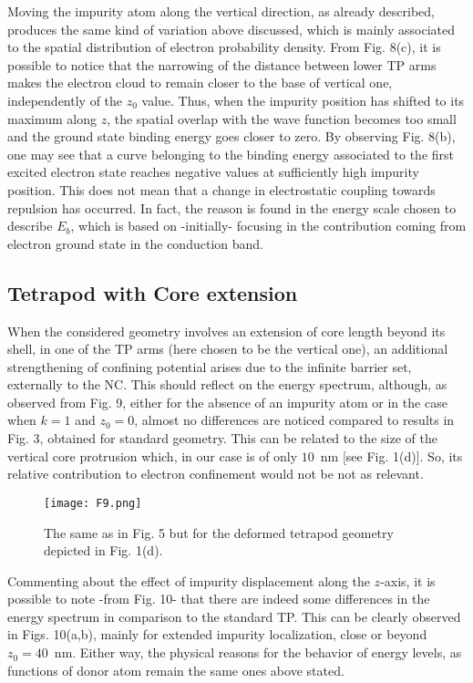 \documentclass[nanomaterials,article,submit,moreauthors,pdftex]{Definitions/mdpi}
\begin{document}
Moving the impurity atom along the vertical direction, as already described, produces the same kind of variation above discussed, which is mainly associated to the spatial distribution of electron probability density. From Fig. 8(c), it is possible to notice that the narrowing of the distance between lower TP arms makes the electron cloud to remain closer to the base of vertical one, independently of the $z_0$ value. Thus, when the impurity position has shifted to its maximum along $z$, the spatial overlap with the wave function becomes too small and the ground state binding energy goes closer to zero. By observing Fig. 8(b), one may see that a curve belonging to the binding energy associated to the first excited electron state reaches negative values at sufficiently high impurity position. This does not mean that a change in electrostatic coupling towards repulsion has occurred. In fact, the reason is found in the energy scale chosen to describe $E_b$, which is based on -initially- focusing in the contribution coming from electron ground state in the conduction band.

\subsection{Tetrapod with Core extension}

When the considered geometry involves an extension of core length beyond its shell, in one of the TP arms (here chosen to be the vertical one), an additional strengthening of confining potential arises due to the infinite barrier set, externally to the NC. This should reflect on the energy spectrum, although, as observed from Fig. 9, either for the absence of an impurity atom or in the case when $k=1$ and $z_0=0$, almost no differences are noticed compared to results in Fig. 3, obtained for standard geometry. This can be related to the size of the vertical core protrusion which, in our case is of only $10\,$ nm [see Fig. 1(d)]. So, its relative contribution to electron confinement would not be not as relevant.
\begin{figure}[H]
    \centering
    \texttt{[image: F9.png]}
    \caption{The same as in Fig. 5 but for the deformed tetrapod geometry depicted in Fig. 1(d).}
    \label{F9}
\end{figure}

Commenting about the effect of impurity displacement along the $z$-axis, it is possible to note -from Fig. 10- that there are indeed some differences in the energy spectrum in comparison to the standard TP. This can be clearly observed in Figs. 10(a,b), mainly for extended impurity localization, close or beyond $z_0=40\,$ nm. Either way, the physical reasons for the behavior of energy levels, as functions of donor atom remain the same ones above stated.
\end{document}
